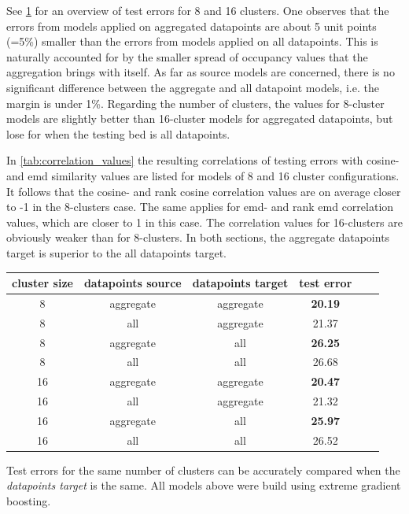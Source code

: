 \documentclass{ws-ijait}
\begin{document}
	See \cref{tab:train_test_errors} for an overview of test errors for 8 and 16 clusters. One observes that the errors from models applied on aggregated datapoints are about 5 unit points (=5\%) smaller than the errors from models applied on all datapoints. This is naturally accounted for by the smaller spread of occupancy values that the aggregation brings with itself. As far as source models are concerned, there is no significant difference between the aggregate and all datapoint models, i.e. the margin is under 1\%. Regarding the number of clusters, the values for 8-cluster models are slightly better than 16-cluster models for aggregated datapoints, but lose for when the testing bed is all datapoints.
	
	In \cref{tab:correlation_values} the resulting correlations of testing errors with cosine- and emd similarity values are listed for models of 8 and 16 cluster configurations. It follows that the cosine- and rank cosine correlation values are on average closer to -1 in the 8-clusters case. The same applies for emd- and rank emd correlation values, which are closer to 1 in this case. The correlation values for 16-clusters are obviously weaker than for 8-clusters. In both sections, the aggregate datapoints target is superior to the all datapoints target.
	
	\begin{table}[!ht]
		{\begin{tabular}{ | c | c | c | c | c | c | }
				\hline
				{cluster size} & {datapoints source} & {datapoints target} & {test error} \\ \hline
				8	&	aggregate 	&	aggregate 	& 	\textbf{20.19} 	\\ \hline
				8	&	all 		&	aggregate 	& 	21.37	\\ \hline \hline
				8	&	aggregate 	&	all 		& 	\textbf{26.25}	\\ \hline
				8	&	all			& 	all 		&	26.68	\\ \hline \hline
				16	&	aggregate	& 	aggregate 	&	\textbf{20.47}	\\ \hline
				16	&	all			& 	aggregate 	& 	21.32	\\ \hline \hline
				16	&	aggregate	& 	all 		& 	\textbf{25.97}	\\ \hline
				16	&	all			&	all 		&	26.52	\\ \hline \hline
		\end{tabular}}
		\label{tab:train_test_errors}
		\begin{tabnote}
			Test errors for the same number of clusters can be accurately compared when the \textit{datapoints target} is the same. All models above were build using extreme gradient boosting.
		\end{tabnote}
	\end{table}
			
\end{document}
